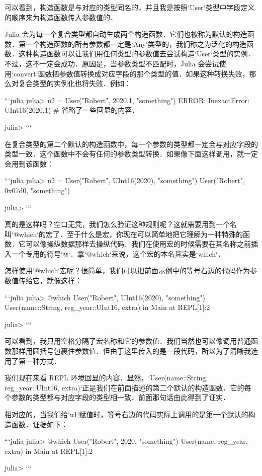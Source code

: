 可以看到，构造函数是与对应的类型同名的，并且我是按照`User`类型中字段定义的顺序来为构造函数传入参数值的．

Julia 会为每一个复合类型都自动生成两个构造函数．它们也被称为默认的构造函数．第一个构造函数的所有参数都一定是`Any`类型的，我们称之为泛化的构造函数．这种构造函数可以让我们用任何类型的参数值去尝试构造`User`类型的实例．不过，这不一定会成功．原因是，当参数类型不匹配时，Julia 会尝试使用`convert`函数把参数值转换成对应字段的那个类型的值．如果这种转换失败，那么对复合类型的实例化也将失败．例如：

```julia
julia> u2 = User("Robert", 2020.1, "something")
ERROR: InexactError: UInt16(2020.1)
# 省略了一些回显的内容．

julia> 
```

在复合类型的第二个默认的构造函数中，每一个参数的类型都一定会与对应字段的类型一致．这个函数中不会有任何的参数类型转换．如果像下面这样调用，就一定会用到该函数：

```julia 
julia> u2 = User("Robert", UInt16(2020), "something")
User("Robert", 0x07d0, "something")

julia> 
```

真的是这样吗？空口无凭，我们怎么验证这种规则呢？这就需要用到一个名叫`@which`的宏了．至于什么是宏，你现在可以简单地把它理解为一种特殊的函数．它可以像操纵数据那样去操纵代码．我们在使用宏的时候需要在其名称之前插入一个专用的符号`@`．拿`@which`来说，这个宏的本名其实是`which`．

怎样使用`@which`宏呢？很简单，我们可以把前面示例中的等号右边的代码作为参数值传给它，就像这样：

```julia
julia> @which User("Robert", UInt16(2020), "something")
User(name::String, reg_year::UInt16, extra) in Main at REPL[1]:2

julia> 
```

可以看到，我只用空格分隔了宏名称和它的参数值．我们当然也可以像调用普通函数那样用圆括号包裹住参数值．但由于这里传入的是一段代码，所以为了清晰我选用了第一种方式．

我们现在来看 REPL 环境回显的内容．显然，`User(name::String, reg_year::UInt16, extra)`正是我们在前面描述的第二个默认的构造函数．它的每个参数的类型都与对应字段的类型相一致．前面那句话由此得到了证实．

相对应的，当我们给`u1`赋值时，等号右边的代码实际上调用的是第一个默认的构造函数．证据如下：

```julia 
julia> @which User("Robert", 2020, "something")
User(name, reg_year, extra) in Main at REPL[1]:2

julia> 
```

